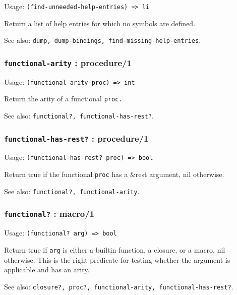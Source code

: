\documentclass[
]{article}
\newcommand{\passthrough}[1]{#1}
\begin{document}
Usage: \passthrough{\lstinline!(find-unneeded-help-entries) => li!}

Return a list of help entries for which no symbols are defined.

See also:
\passthrough{\lstinline!dump, dump-bindings, find-missing-help-entries!}.

\hypertarget{functional-arity-procedure1}{%
\subsubsection{\texorpdfstring{\texttt{functional-arity} :
procedure/1}{functional-arity : procedure/1}}\label{functional-arity-procedure1}}

Usage: \passthrough{\lstinline!(functional-arity proc) => int!}

Return the arity of a functional \passthrough{\lstinline!proc.!}

See also: \passthrough{\lstinline!functional?, functional-has-rest?!}.

\hypertarget{functional-has-rest-procedure1}{%
\subsubsection{\texorpdfstring{\texttt{functional-has-rest?} :
procedure/1}{functional-has-rest? : procedure/1}}\label{functional-has-rest-procedure1}}

Usage: \passthrough{\lstinline!(functional-has-rest? proc) => bool!}

Return true if the functional \passthrough{\lstinline!proc!} has a
\&rest argument, nil otherwise.

See also: \passthrough{\lstinline!functional?, functional-arity!}.

\hypertarget{functional-macro1}{%
\subsubsection{\texorpdfstring{\texttt{functional?} :
macro/1}{functional? : macro/1}}\label{functional-macro1}}

Usage: \passthrough{\lstinline!(functional? arg) => bool!}

Return true if \passthrough{\lstinline!arg!} is either a builtin
function, a closure, or a macro, nil otherwise. This is the right
predicate for testing whether the argument is applicable and has an
arity.

See also:
\passthrough{\lstinline!closure?, proc?, functional-arity, functional-has-rest?!}.
\end{document}
